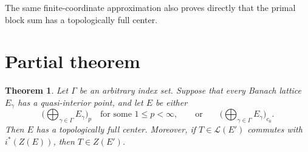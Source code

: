 \documentclass[11pt]{amsart}
\newtheorem{theorem}{Theorem}
\newcommand{\cL}{\mathcal L}
\begin{document}
The same finite-coordinate approximation also proves directly that the
primal block sum has a topologically full center.

\section*{Partial theorem}

\begin{theorem}\label{thm:main}
Let $\Gamma$ be an arbitrary index set.  Suppose that every Banach lattice
$E_\gamma$ has a quasi-interior point, and let $E$ be either
\[
 \Big(\bigoplus_{\gamma\in\Gamma}E_\gamma\Big)_p
 \quad\text{for some }1\leq p<\infty,
 \qquad\text{or}\qquad
 \Big(\bigoplus_{\gamma\in\Gamma}E_\gamma\Big)_{c_0}.
\]
Then $E$ has a topologically full center.  Moreover, if
$T\in\cL(E')$ commutes with $i^*(Z(E))$, then $T\in Z(E')$.
\end{theorem}
\end{document}
